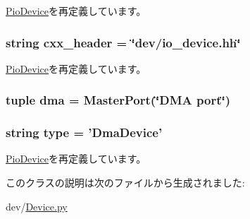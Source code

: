 \hyperlink{classDevice_1_1PioDevice_a17fa61ac3806b481cafee5593b55e5d0}{PioDevice}を再定義しています。\hypertarget{classDevice_1_1DmaDevice_a17da7064bc5c518791f0c891eff05fda}{
\subsubsection[{cxx\_\-header}]{\setlength{\rightskip}{0pt plus 5cm}string {\bf cxx\_\-header} = \char`\"{}dev/io\_\-device.hh\char`\"{}}}
\label{classDevice_1_1DmaDevice_a17da7064bc5c518791f0c891eff05fda}


\hyperlink{classDevice_1_1PioDevice_a17da7064bc5c518791f0c891eff05fda}{PioDevice}を再定義しています。\hypertarget{classDevice_1_1DmaDevice_abdac2228870fba23068128b66c85f31f}{
\subsubsection[{dma}]{\setlength{\rightskip}{0pt plus 5cm}tuple {\bf dma} = {\bf MasterPort}(\char`\"{}DMA port\char`\"{})}}
\label{classDevice_1_1DmaDevice_abdac2228870fba23068128b66c85f31f}
\hypertarget{classDevice_1_1DmaDevice_acce15679d830831b0bbe8ebc2a60b2ca}{
\subsubsection[{type}]{\setlength{\rightskip}{0pt plus 5cm}string {\bf type} = '{\bf DmaDevice}'}}
\label{classDevice_1_1DmaDevice_acce15679d830831b0bbe8ebc2a60b2ca}


\hyperlink{classDevice_1_1PioDevice_acce15679d830831b0bbe8ebc2a60b2ca}{PioDevice}を再定義しています。

このクラスの説明は次のファイルから生成されました:\begin{DoxyCompactItemize}
\item 
dev/\hyperlink{Device_8py}{Device.py}\end{DoxyCompactItemize}
